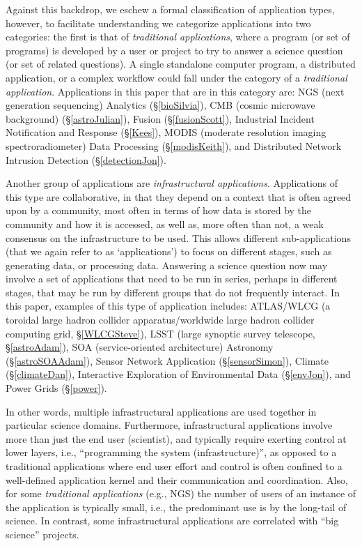 Against this backdrop, we eschew a formal classification of application types,
however, to facilitate understanding we categorize applications into two
categories: the first is that of {\em traditional applications}, where
a program (or set of programs) is developed by a user or project to try to
answer a science question (or set of related questions). 
A single standalone computer program, a distributed application, or a
complex workflow could fall under the category of a {\em traditional
application}.  Applications in this paper that are in this category are: NGS (next generation
sequencing) Analytics (\S\ref{bioSilvia}), CMB (cosmic microwave background)
(\S\ref{astroJulian}), Fusion (\S\ref{fusionScott}), Industrial Incident
Notification and Response (\S\ref{Kees}), MODIS (moderate resolution imaging
spectroradiometer) Data Processing (\S\ref{modisKeith}), and Distributed Network
Intrusion Detection (\S\ref{detectionJon}).

Another group of applications are {\em infrastructural applications}.
Applications of this type are collaborative, in that they depend on a context
that is often agreed upon by a community, most often in terms of how data is
stored by the community and how it is accessed, as well as, more often than not,
a weak consensus on the infrastructure to be used.  This allows different
sub-applications (that we again refer to as `applications') to focus on
different stages, such as generating data, or processing data.  Answering a
science question now may involve a set of applications that need to be run in
series, perhaps in different stages, that may be run by different groups that do
not frequently interact.  In this paper, examples of this type of application includes: ATLAS/WLCG (a
toroidal large hadron collider apparatus/worldwide large hadron collider
computing grid, \S\ref{WLCGSteve}), LSST (large synoptic survey telescope,
\S\ref{astroAdam}), SOA (service-oriented architecture) Astronomy
(\S\ref{astroSOAAdam}), Sensor Network Application (\S\ref{sensorSimon}),
Climate (\S\ref{climateDan}), Interactive Exploration of Environmental Data
(\S\ref{envJon}), and Power Grids (\S\ref{power}).

In other words, multiple infrastructural applications are used together in
particular science domains.  Furthermore, infrastructural applications involve
more than just the end user (scientist), and typically require exerting control
at lower layers, i.e., ``programming the system (infrastructure)'', as opposed
to a traditional applications where end user effort and control is often
confined to a well-defined application kernel and their communication and
coordination.  Also, for some {\em traditional applications} (e.g., NGS) the
number of users of an instance of the application is typically small, i.e., the
predominant use is by the long-tail of science. In contrast, some
infrastructural applications are correlated with ``big science'' projects.

